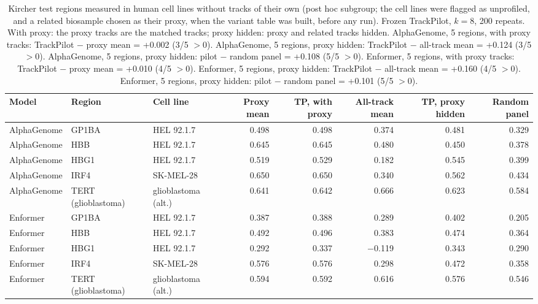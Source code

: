\begin{table}[H]
\caption{Kircher test regions measured in human cell lines without tracks of their own (post hoc subgroup; the cell lines were flagged as unprofiled, and a related biosample chosen as their proxy, when the variant table was built, before any run). Frozen TrackPilot, $k=8$, 200 repeats. With proxy: the proxy tracks are the matched tracks; proxy hidden: proxy and related tracks hidden. AlphaGenome, 5 regions, with proxy tracks: TrackPilot $-$ proxy mean = +0.002 (3/5 $>0$). AlphaGenome, 5 regions, proxy hidden: TrackPilot $-$ all-track mean = +0.124 (3/5 $>0$). AlphaGenome, 5 regions, proxy hidden: pilot $-$ random panel = +0.108 (5/5 $>0$). Enformer, 5 regions, with proxy tracks: TrackPilot $-$ proxy mean = +0.010 (4/5 $>0$). Enformer, 5 regions, proxy hidden: TrackPilot $-$ all-track mean = +0.160 (4/5 $>0$). Enformer, 5 regions, proxy hidden: pilot $-$ random panel = +0.101 (5/5 $>0$).}\label{tab:s13}
\centering\small
\begin{tabular}{lllrrrrr}
\toprule
Model & Region & Cell line & Proxy mean & TP, with proxy & All-track mean & TP, proxy hidden & Random panel \\
\midrule
AlphaGenome & GP1BA & HEL 92.1.7 & 0.498 & 0.498 & 0.374 & 0.481 & 0.329 \\
AlphaGenome & HBB & HEL 92.1.7 & 0.645 & 0.645 & 0.480 & 0.450 & 0.378 \\
AlphaGenome & HBG1 & HEL 92.1.7 & 0.519 & 0.529 & 0.182 & 0.545 & 0.399 \\
AlphaGenome & IRF4 & SK-MEL-28 & 0.650 & 0.650 & 0.340 & 0.562 & 0.434 \\
AlphaGenome & TERT (glioblastoma) & glioblastoma (alt.) & 0.641 & 0.642 & 0.666 & 0.623 & 0.584 \\
Enformer & GP1BA & HEL 92.1.7 & 0.387 & 0.388 & 0.289 & 0.402 & 0.205 \\
Enformer & HBB & HEL 92.1.7 & 0.492 & 0.496 & 0.383 & 0.474 & 0.364 \\
Enformer & HBG1 & HEL 92.1.7 & 0.292 & 0.337 & $-$0.119 & 0.343 & 0.290 \\
Enformer & IRF4 & SK-MEL-28 & 0.576 & 0.576 & 0.298 & 0.472 & 0.358 \\
Enformer & TERT (glioblastoma) & glioblastoma (alt.) & 0.594 & 0.592 & 0.616 & 0.576 & 0.546 \\
\bottomrule
\end{tabular}
\end{table}

